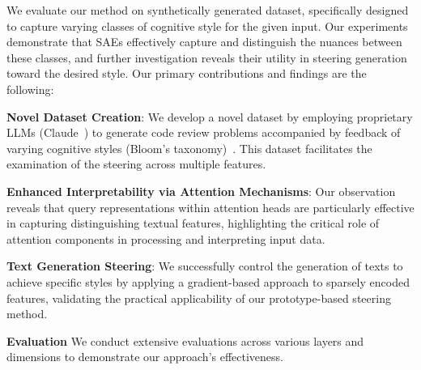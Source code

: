 We evaluate our method on synthetically generated dataset, specifically designed to capture varying classes of cognitive style for the given input. Our experiments demonstrate that SAEs effectively capture and distinguish the nuances between these classes, and further investigation reveals their utility in steering generation toward the desired style. Our primary contributions and findings are the following:

\noindent\textbf{Novel Dataset Creation}: We develop a novel dataset by employing proprietary LLMs (Claude~\cite{anthropic2023introducing}) to generate code review problems accompanied by feedback of varying cognitive styles (Bloom's taxonomy)~\cite{uugur2015self}. This dataset facilitates the examination of the steering across multiple features. 

    
    \noindent \textbf{Enhanced Interpretability via Attention Mechanisms}: Our observation reveals that query representations within attention heads are particularly effective in capturing distinguishing textual features, highlighting the critical role of attention components in processing and interpreting input data.

    \noindent \textbf{Text Generation Steering}: We successfully control the generation of texts to achieve specific styles by applying a gradient-based approach to sparsely encoded features, validating the practical applicability of our prototype-based steering method.

    
    \noindent \textbf{Evaluation} We conduct extensive evaluations across various layers and dimensions to demonstrate our approach's effectiveness.

